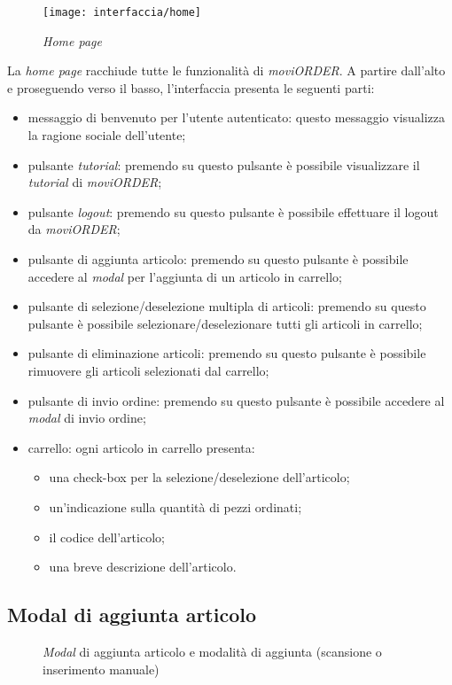 \begin{figure}[!h] 
    \centering 
    \texttt{[image: interfaccia/home]} 
    \caption{\textit{Home page}}
\end{figure}
La \textit{home page} racchiude tutte le funzionalità di \textit{moviORDER}. A partire dall'alto e proseguendo verso il basso, l'interfaccia presenta le seguenti parti:
\begin{itemize}
	\item messaggio di benvenuto per l'utente autenticato: questo messaggio visualizza la ragione sociale dell'utente;
	\item pulsante \textit{tutorial}: premendo su questo pulsante è possibile visualizzare il \textit{tutorial} di \textit{moviORDER};
	\item pulsante \textit{logout}: premendo su questo pulsante è possibile effettuare il logout da \textit{moviORDER};
	\item pulsante di aggiunta articolo: premendo su questo pulsante è possibile accedere al \textit{modal} per l'aggiunta di un articolo in carrello; 
	\item pulsante di selezione/deselezione multipla di articoli: premendo su questo pulsante è possibile selezionare/deselezionare tutti gli articoli in carrello;
	\item pulsante di eliminazione articoli: premendo su questo pulsante è possibile rimuovere gli articoli selezionati dal carrello;
	\item pulsante di invio ordine: premendo su questo pulsante è possibile accedere al \textit{modal} di invio ordine;
	\item carrello: ogni articolo in carrello presenta:
	\begin{itemize}
		\item una check-box per la selezione/deselezione dell'articolo;
		\item un'indicazione sulla quantità di pezzi ordinati;
		\item il codice dell'articolo;
		\item una breve descrizione dell'articolo.
	\end{itemize}
\end{itemize}

\subsection{Modal di aggiunta articolo}

\begin{figure}[!h] 
    \centering 
    \caption{\textit{Modal} di aggiunta articolo e modalità di aggiunta (scansione o inserimento manuale)}
\end{figure}

